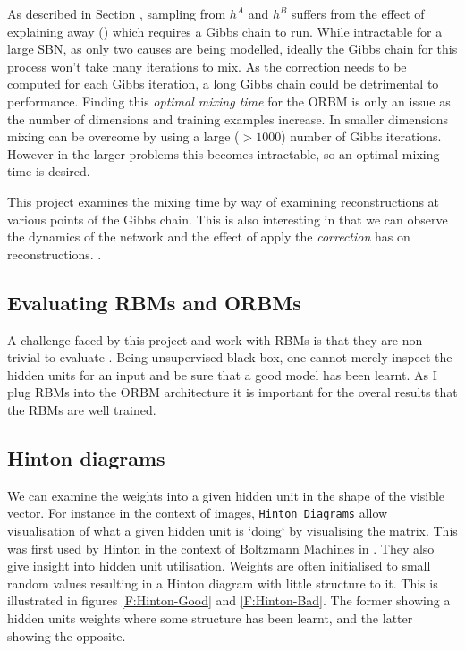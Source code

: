As described in Section \todocite{\ref{}}, sampling from $h^A$ and $h^B$ suffers from the effect of explaining away (\todocite{\ref{}}) which requires a Gibbs chain to run. While intractable for a large SBN, as only two causes are being modelled, ideally the Gibbs chain for this process won't take many iterations to mix. As the correction needs to be computed for each Gibbs iteration, a long Gibbs chain could be detrimental to performance.
Finding this \emph{optimal mixing time} for the ORBM is only an issue as the number of dimensions and training examples increase. In smaller dimensions mixing can be overcome by using a large ($>1000$) number of Gibbs iterations. However in the larger problems this becomes intractable, so an optimal mixing time is desired.

This project examines the mixing time by way of examining reconstructions at various points of the Gibbs chain. This is also interesting in that we can observe the dynamics of the network and the effect of apply the \emph{correction} has on reconstructions. .

\subsection{Evaluating RBMs and ORBMs}

  A challenge faced by this project and work with RBMs is that they are non-trivial to evaluate \todocite{}. Being unsupervised black box, one cannot merely inspect the hidden units for an input and be sure that a good model has been learnt. As I plug RBMs into the ORBM architecture it is important for the overal results that the RBMs are well trained.

\subsection{Hinton diagrams}
  We can examine the weights into a given hidden unit in the shape of the visible vector. For instance in the context of images, \texttt{Hinton Diagrams} allow visualisation of what a given hidden unit is `doing` by visualising the matrix. This was first used by Hinton in the context of Boltzmann Machines in \cite{Hinton:1986:LRB:104279.104291}. They also give insight into hidden unit utilisation. Weights are often initialised to small random values resulting in a Hinton diagram with little structure to it. This is illustrated in figures \ref{F:Hinton-Good} and \ref{F:Hinton-Bad}. The former showing a hidden units weights where some structure has been learnt, and the latter showing the opposite.

